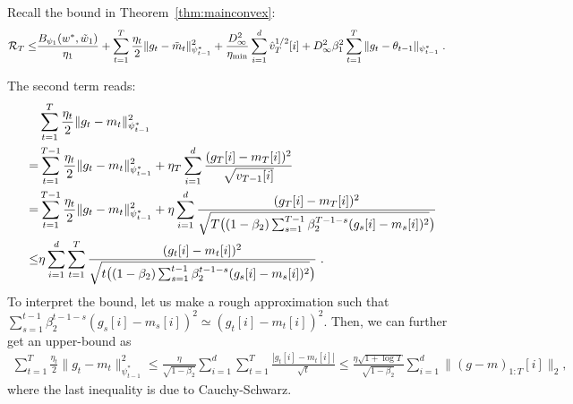 \documentclass[twoside]{article}
\makeatletter
\renewenvironment{proof}[1][\proofname]{%
   \par\pushQED{\qed}\normalfont%
   \topsep6\p@\@plus6\p@\relax
   \trivlist\item[\hskip\labelsep\bfseries#1]%
   \ignorespaces
}{%
   \popQED\endtrivlist\@endpefalse
}
\makeatother
\begin{document}
\begin{proof}
Recall the bound in Theorem~\ref{thm:mainconvex}:
\begin{equation}\notag
\begin{aligned}
\mathcal{R}_T \leq &   \frac{ B_{\psi_1}(w^*, \tilde{w}_{1})}{\eta_1}
+ \sum_{t=1}^T\frac{\eta_t}{2} \| g_t - \tilde{m}_t  \|_{\psi_{t-1}^*}^2  + \frac{D_{\infty}^2}{\eta_{\min}}  \sum_{i=1}^d \hat{v}_{T}^{1/2}[i] + D_{\infty}^2\beta_1^2   \sum_{t=1}^T  \| g_t - \theta_{t-1}  \|_{\psi_{t-1}^*}\;.
\end{aligned}
\end{equation}

The second term reads:
\begin{align*}
     &\sum_{t=1}^T \frac{\eta_t}{2} \|g_t - m_t  \|_{\psi_{t-1}^*}^2 \\
      =&\sum_{t=1}^{T-1} \frac{\eta_t}{2} \|g_t - m_t  \|_{\psi_{t-1}^*}^2   + \eta_T \sum_{i=1}^d \frac{ (g_{T}[i] - m_{T}[i])^2 }{ \sqrt{ v_{T-1}[i]} }\\
=&\sum_{t=1}^{T-1} \frac{\eta_t}{2} \|g_t - m_t  \|_{\psi_{t-1}^*}^2 + \eta \sum_{i=1}^d \frac{ (g_{T}[i] - m_{T}[i])^2 }{ \sqrt{ T \big( (1-\beta_2) \sum_{s=1}^{T-1} \beta_2^{T-1-s} (g_{s}[i] - m_{s}[i])^2 } \big) }\\
\leq &  \eta \sum_{i=1}^d \sum_{t=1}^T \frac{ (g_{t}[i] - m_{t}[i])^2 }{ \sqrt{ t \big( (1-\beta_2) \sum_{s=1}^{t-1} \beta_2^{t-1-s} (g_{s}[i] - m_{s}[i])^2 } \big) } \;.
\end{align*}
To interpret the bound, let us make a rough approximation such that
$\sum_{s=1}^{t-1} \beta_2^{t-1-s} (g_{s}[i] - m_{s}[i])^2  \simeq (g_{t}[i] - m_t[i])^2 $.
Then, we can further get an upper-bound as 
\begin{align*}
    \sum_{t=1}^T \frac{\eta_t}{2} \|g_t - m_t  \|_{\psi_{t-1}^*}^2 \leq
    \frac{\eta}{\sqrt{1 - \beta_2}} \sum_{i=1}^d \sum_{t=1}^{T} \frac{ | g_{t}[i] - m_{t}[i] | }{ \sqrt{t} }\leq \frac{\eta \sqrt{1 + \log T}}{\sqrt{1 - \beta_2}} \sum_{i=1}^d \| (g-m)_{1:T}[i] \|_2 ,
\end{align*}
where the last inequality is due to Cauchy-Schwarz.


\end{proof}

\vspace{0.2in}
\end{document}

